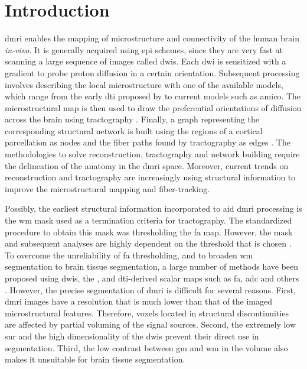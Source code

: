 \section{Introduction}\label{sec:regseg-intro}
\Acrlong*{dmri} enables the mapping of microstructure \citep{basser_microstructural_1996}
  and connectivity \citep{craddock_imaging_2013} of the human brain \emph{in-vivo}.
It is generally acquired using \gls*{epi} schemes, since they are very fast at
  scanning a large sequence of images called \glspl*{dwi}.
Each \gls*{dwi} is sensitized with a gradient to probe proton diffusion in a certain
  orientation.
Subsequent processing involves describing the local microstructure with one of the available
  models, which range from the early \gls*{dti} proposed by \cite{basser_microstructural_1996}
  to current models such as \gls*{amico}.
The microstructural map is then used to draw the preferential orientations of diffusion
  across the brain using tractography \citep{mori_threedimensional_1999}.
Finally, a graph representing the corresponding structural network is built using
  the regions of a cortical parcellation as nodes and the fiber paths found by
  tractography as edges \citep{hagmann_mapping_2008}.
The methodologies to solve reconstruction, tractography and network building
  require the delineation of the anatomy in the \gls*{dmri} space.
Moreover, current trends on reconstruction \citep{jeurissen_multitissue_2014} and
  tractography \citep{smith_anatomicallyconstrained_2012} are increasingly using
  structural information to improve the microstructural mapping and fiber-tracking.

Possibly, the earliest structural information incorporated to aid \gls*{dmri} processing
  is the \gls*{wm} mask used as a termination criteria for tractography.
The standardized procedure to obtain this mask was thresholding the \gls*{fa} map.
However, the mask and subsequent analyses are highly dependent on the 
  threshold that is chosen \citep{taoka_fractional_2009}.
To overcome the unreliability of \gls*{fa} thresholding, and to broaden
  \gls*{wm} segmentation to brain tissue segmentation, a large number of
  methods have been proposed using \glspl*{dwi}, the \lowb{}, and \gls*{dti}-derived
  scalar maps such as \gls*{fa}, \gls*{adc} and others \citep{zhukov_level_2003,
  rousson_level_2004,jonasson_segmentation_2005,hadjiprocopis_unbiased_2005,liu_brain_2007,
  lu_segmentation_2008,han_experimental_2009}.
However, the precise segmentation of \gls*{dmri} is difficult for several reasons.
First, \gls{dmri} images have a resolution that is much lower
  than that of the imaged microstructural features.
Therefore, voxels located in structural discontinuities are affected by partial
  voluming of the signal sources.
Second, the extremely low \gls*{snr} and the high dimensionality of the \glspl*{dwi} prevent
  their direct use in segmentation.
Third, the low contrast between \gls*{gm} and \gls*{wm} in the \lowb{} volume also makes
  it unsuitable for brain tissue segmentation.

